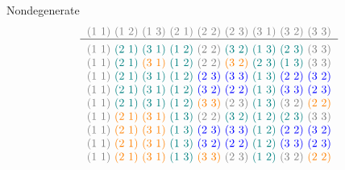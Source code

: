 \begin{xmpl}
Nondegenerate
\small
$$
	\begin{tabular}{c}
		\textcolor{gray}{(1 1) (1 2) (1 3) (2 1) (2 2) (2 3) (3 1) (3 2) (3 3)}\\
		\hline\\[-3mm]
		\textcolor{gray}{(1 1)} \textcolor{teal}{(2 1)} \textcolor{teal}{(3 1)} \textcolor{teal}{(1 2)} \textcolor{gray}{(2 2)} \textcolor{teal}{(3 2)} \textcolor{teal}{(1 3)} \textcolor{teal}{(2 3)} \textcolor{gray}{(3 3)}\\
		\textcolor{gray}{(1 1)} \textcolor{teal}{(2 1)} \textcolor{orange}{(3 1)} \textcolor{teal}{(1 2)} \textcolor{gray}{(2 2)} \textcolor{orange}{(3 2)} \textcolor{teal}{(2 3)} \textcolor{teal}{(1 3)} \textcolor{gray}{(3 3)}\\
		\textcolor{gray}{(1 1)} \textcolor{teal}{(2 1)} \textcolor{teal}{(3 1)} \textcolor{teal}{(1 2)} \textcolor{blue}{(2 3)} \textcolor{blue}{(3 3)} \textcolor{teal}{(1 3)} \textcolor{blue}{(2 2)} \textcolor{blue}{(3 2)}\\
		\textcolor{gray}{(1 1)} \textcolor{teal}{(2 1)} \textcolor{teal}{(3 1)} \textcolor{teal}{(1 2)} \textcolor{blue}{(3 2)} \textcolor{blue}{(2 2)} \textcolor{teal}{(1 3)} \textcolor{blue}{(3 3)} \textcolor{blue}{(2 3)}\\
		\textcolor{gray}{(1 1)} \textcolor{teal}{(2 1)} \textcolor{teal}{(3 1)} \textcolor{teal}{(1 2)} \textcolor{orange}{(3 3)} \textcolor{gray}{(2 3)} \textcolor{teal}{(1 3)} \textcolor{gray}{(3 2)} \textcolor{orange}{(2 2)}\\
		\textcolor{gray}{(1 1)} \textcolor{orange}{(2 1)} \textcolor{orange}{(3 1)} \textcolor{teal}{(1 3)} \textcolor{gray}{(2 2)} \textcolor{teal}{(3 2)} \textcolor{teal}{(1 2)} \textcolor{teal}{(2 3)} \textcolor{gray}{(3 3)}\\
		\textcolor{gray}{(1 1)} \textcolor{orange}{(2 1)} \textcolor{orange}{(3 1)} \textcolor{teal}{(1 3)} \textcolor{blue}{(2 3)} \textcolor{blue}{(3 3)} \textcolor{teal}{(1 2)} \textcolor{blue}{(2 2)} \textcolor{blue}{(3 2)}\\
		\textcolor{gray}{(1 1)} \textcolor{orange}{(2 1)} \textcolor{orange}{(3 1)} \textcolor{teal}{(1 3)} \textcolor{blue}{(3 2)} \textcolor{blue}{(2 2)} \textcolor{teal}{(1 2)} \textcolor{blue}{(3 3)} \textcolor{blue}{(2 3)}\\
		\textcolor{gray}{(1 1)} \textcolor{orange}{(2 1)} \textcolor{orange}{(3 1)} \textcolor{teal}{(1 3)} \textcolor{orange}{(3 3)} \textcolor{gray}{(2 3)} \textcolor{teal}{(1 2)} \textcolor{gray}{(3 2)} \textcolor{orange}{(2 2)}\\

\end{tabular}$$
\end{xmpl}
